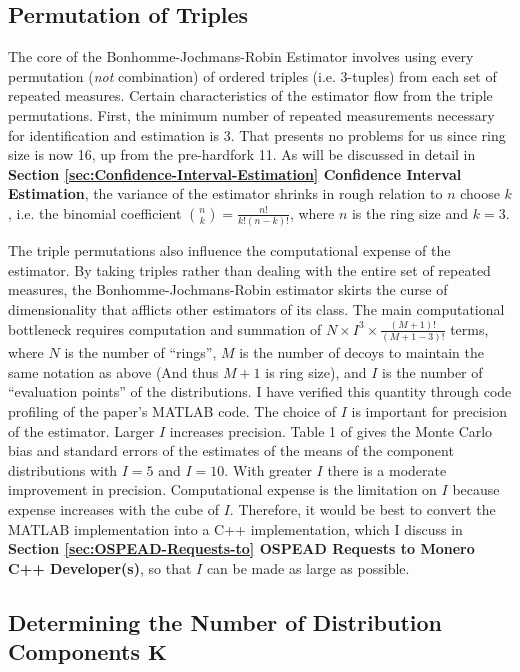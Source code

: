 \documentclass[english]{article}
\begin{document}
\subsection{Permutation of Triples}

The core of the Bonhomme-Jochmans-Robin Estimator involves using every
permutation (\textit{not} combination) of ordered triples (i.e. 3-tuples)
from each set of repeated measures. Certain characteristics of the
estimator flow from the triple permutations. First, the minimum number
of repeated measurements necessary for identification and estimation
is 3. That presents no problems for us since ring size is now 16,
up from the pre-hardfork 11. As will be discussed in detail in \textbf{Section
\ref{sec:Confidence-Interval-Estimation} Confidence Interval Estimation},
the variance of the estimator shrinks in rough relation to $n$ choose
$k$, i.e. the binomial coefficient $\binom{n}{k}=\tfrac{n!}{k!(n-k)!}$,
where $n$ is the ring size and $k=3$.

The triple permutations also influence the computational expense of
the estimator. By taking triples rather than dealing with the entire
set of repeated measures, the Bonhomme-Jochmans-Robin estimator skirts
the curse of dimensionality that afflicts other estimators of its
class. The main computational bottleneck requires computation and
summation of $N\times I^{3}\times\tfrac{\left(M+1\right)!}{\left(M+1-3\right)!}$
terms, where $N$ is the number of ``rings'', $M$ is the number
of decoys to maintain the same notation as above (And thus $M+1$
is ring size), and $I$ is the number of ``evaluation points'' of
the distributions. I have verified this quantity through code profiling
of the paper's MATLAB code. The choice of $I$ is important for precision
of the estimator. Larger $I$ increases precision. Table 1 of \cite{Bonhomme2016}
gives the Monte Carlo bias and standard errors of the estimates of
the means of the component distributions with $I=5$ and $I=10$.
With greater $I$ there is a moderate improvement in precision. Computational
expense is the limitation on $I$ because expense increases with the
cube of $I$. Therefore, it would be best to convert the MATLAB implementation
into a C++ implementation, which I discuss in \textbf{Section \ref{sec:OSPEAD-Requests-to}
OSPEAD Requests to Monero C++ Developer(s)}, so that $I$ can be made
as large as possible.

\subsection{Determining the Number of Distribution Components $\boldsymbol{K}$}
\end{document}
